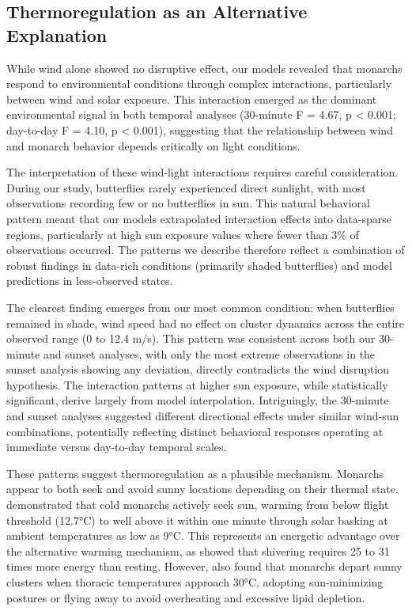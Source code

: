 \subsection{Thermoregulation as an Alternative Explanation}

While wind alone showed no disruptive effect, our models revealed that monarchs respond to environmental conditions through complex interactions, particularly between wind and solar exposure. This interaction emerged as the dominant environmental signal in both temporal analyses (30-minute F = 4.67, p < 0.001; day-to-day F = 4.10, p < 0.001), suggesting that the relationship between wind and monarch behavior depends critically on light conditions.

The interpretation of these wind-light interactions requires careful consideration. During our study, butterflies rarely experienced direct sunlight, with most observations recording few or no butterflies in sun. This natural behavioral pattern meant that our models extrapolated interaction effects into data-sparse regions, particularly at high sun exposure values where fewer than 3\% of observations occurred. The patterns we describe therefore reflect a combination of robust findings in data-rich conditions (primarily shaded butterflies) and model predictions in less-observed states.

The clearest finding emerges from our most common condition: when butterflies remained in shade, wind speed had no effect on cluster dynamics across the entire observed range (0 to 12.4 m/s). This pattern was consistent across both our 30-minute and sunset analyses, with only the most extreme observations in the sunset analysis showing any deviation, directly contradicts the wind disruption hypothesis. The interaction patterns at higher sun exposure, while statistically significant, derive largely from model interpolation. Intriguingly, the 30-minute and sunset analyses suggested different directional effects under similar wind-sun combinations, potentially reflecting distinct behavioral responses operating at immediate versus day-to-day temporal scales.

These patterns suggest thermoregulation as a plausible mechanism. Monarchs appear to both seek and avoid sunny locations depending on their thermal state. \textcite{mastersMonarchButterflyDanaus1988} demonstrated that cold monarchs actively seek sun, warming from below flight threshold (12.7°C) to well above it within one minute through solar basking at ambient temperatures as low as 9°C. This represents an energetic advantage over the alternative warming mechanism, as \textcite{kammerThoracicTemperatureShivering1970} showed that shivering requires 25 to 31 times more energy than resting. However, \textcite{mastersMonarchButterflyDanaus1988} also found that monarchs depart sunny clusters when thoracic temperatures approach 30°C, adopting sun-minimizing postures or flying away to avoid overheating and excessive lipid depletion.

